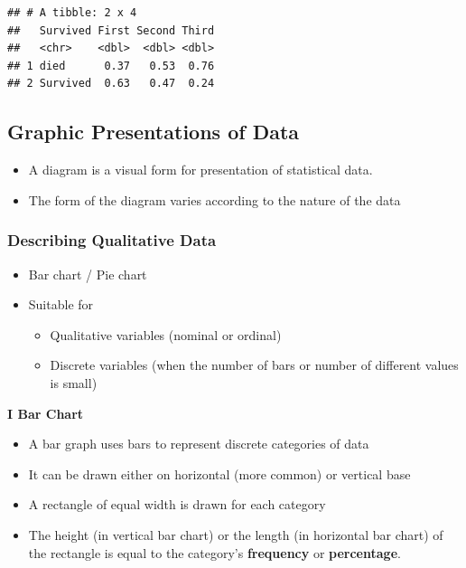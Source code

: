 \documentclass[]{book}
\providecommand{\tightlist}{%
  \setlength{\itemsep}{0pt}\setlength{\parskip}{0pt}}
\begin{document}
\begin{verbatim}
## # A tibble: 2 x 4
##   Survived First Second Third
##   <chr>    <dbl>  <dbl> <dbl>
## 1 died      0.37   0.53  0.76
## 2 Survived  0.63   0.47  0.24
\end{verbatim}

\hypertarget{graphic-presentations-of-data}{%
\subsection{Graphic Presentations of Data}\label{graphic-presentations-of-data}}

\begin{itemize}
\tightlist
\item
  A diagram is a visual form for presentation of statistical data.
\item
  The form of the diagram varies according to the nature of the data
\end{itemize}

\hypertarget{describing-qualitative-data}{%
\subsubsection{Describing Qualitative Data}\label{describing-qualitative-data}}

\begin{itemize}
\tightlist
\item
  Bar chart / Pie chart
\item
  Suitable for

  \begin{itemize}
  \tightlist
  \item
    Qualitative variables (nominal or ordinal)
  \item
    Discrete variables (when the number of bars or number of different values is small)
  \end{itemize}
\end{itemize}

\textbf{I Bar Chart}

\begin{itemize}
\tightlist
\item
  A bar graph uses bars to represent discrete categories of data
\item
  It can be drawn either on horizontal (more common) or vertical base
\item
  A rectangle of equal width is drawn for each category
\item
  The height (in vertical bar chart) or the length (in horizontal bar chart) of the rectangle is equal to the category's \textbf{frequency} or \textbf{percentage}.
\end{itemize}
\end{document}
